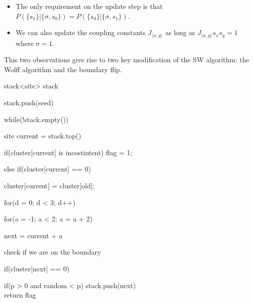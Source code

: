 \documentclass[12pt,handout]{beamer}
\begin{document}
\begin{frame}
\begin{center}

{\large
\begin{itemize}

\item The only requirement on the update step is that  $P \left( \lbrace s_1 \rbrace | \lbrace \sigma, s_0 \rbrace \right) = P \left( \lbrace s_0 \rbrace | \lbrace \sigma, s_1 \rbrace \right)$.
\item We can also update the coupling constants $J_{\langle x, y \rangle}$ as long as $J_{\langle x, y \rangle} s_x s_y = 1$ where $\sigma = 1$.

\end{itemize}}

\vspace{30pt}

This two observations give rise to two key modification of the SW algorithm: the Wolff algorithm and the boundary flip.

\end{center}
\end{frame}


\begin{frame}

stack<site> stack

stack.push(seed)

while(!stack.empty())

\quad site current = stack.top()

\quad if(cluster[current] is incostintent) flag = 1;

\quad else if(cluster[current] == 0)

\quad \quad cluster[current] = cluster[old];

\quad \quad for(d = 0; d < 3; d++) 

\quad \quad \quad for(a = -1; a < 2; a = a + 2) 

\quad \quad \quad next = current + a

\quad \quad \quad check if we are on the boundary
				
\quad \quad \quad if(cluster[next] == 0)

\quad \quad \quad \quad if(p > 0 and random < p) stack.push(next)\\
return flag

\end{frame}


\end{document}
